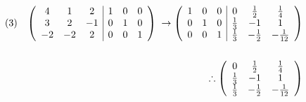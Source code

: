 \documentclass[dvipdfmx,uplatex]{jsarticle}
\begin{document}
  \begin{equation}
    \begin{aligned}
        (3)\hspace{3mm}
        \left(
            \begin{array}{ccc|ccc} 
                4 & 1 & 2 & 1 & 0 & 0 \\
                3 & 2 & -1 & 0 & 1 & 0 \\
                -2 & -2 & 2 & 0 & 0 & 1 \\
            \end{array}
        \right) \hspace{1mm} \to
        \left(
            \begin{array}{ccc|ccc}
                1 & 0 & 0 & 0 & \frac{1}{2} & \frac{1}{4} \\
                0 & 1 & 0 & \frac{1}{3} & -1 & 1 \\
                0 & 0 & 1 & \frac{1}{3} & -\frac{1}{2} & -\frac{1}{12} \\
            \end{array} 
        \right) \nonumber\\
        \\
        \therefore \left(
            \begin{array}{ccc}
                0 & \frac{1}{2} & \frac{1}{4} \\
                \frac{1}{3} & -1 & 1 \\
                \frac{1}{3} & -\frac{1}{2} & -\frac{1}{12} \\
            \end{array} 
        \right)
    \end{aligned}
  \end{equation}
\end{document}

